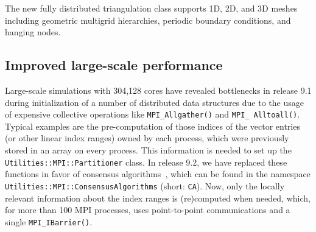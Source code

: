 \documentclass{ansarticle-preprint}
\begin{document}


The new fully distributed triangulation class supports 1D, 2D, and 3D meshes
including geometric multigrid hierarchies, periodic boundary conditions, and
hanging nodes.




\subsection{Improved large-scale performance}
\label{subsec:performance}

Large-scale simulations with 304,128 cores have revealed bottlenecks in release
9.1 during initialization of a number of distributed data structures due to the usage of expensive collective operations
like \texttt{MPI\_Allgather()} and \texttt{MPI\_\allowbreak
  Alltoall()}. Typical examples are the
pre-computation of those indices of the vector entries (or
other linear index ranges) owned by
each process, which were previously stored in  an array on every process.
This information is needed to set up
the  \texttt{Utilities::MPI::Par\-ti\-ti\-oner} class.
In release 9.2, we have replaced these functions in favor of
consensus algorithms~\cite{hoefler2010scalable}, which can be
found in the namespace \texttt{Utilities::\allowbreak MPI::\allowbreak ConsensusAlgorithms} (short: \texttt{CA}).
Now, only the locally relevant information about the index ranges is
(re)computed when needed, which, for more than 100 MPI processes, uses
point-to-point communications and a single \texttt{MPI\_IBarrier()}.
\end{document}
